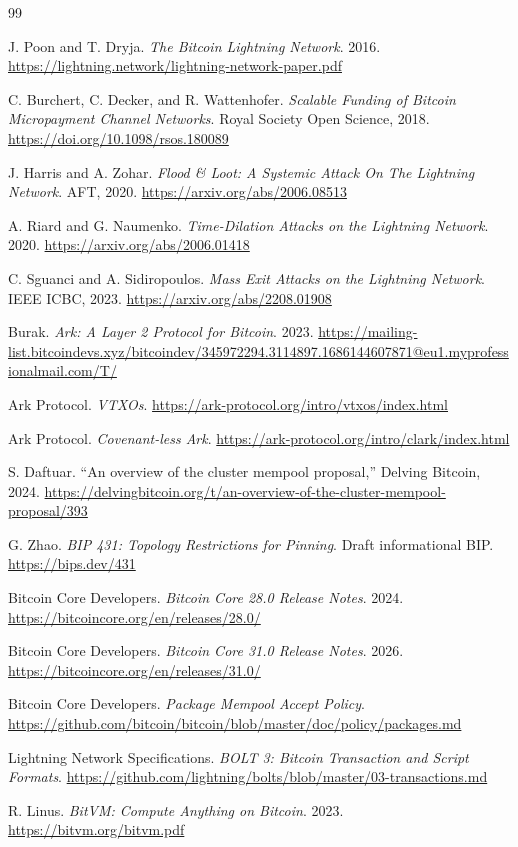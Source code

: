 \documentclass{article}
\theoremstyle{definition}
\begin{document}
\begin{thebibliography}{99}
\raggedright

 J. Poon and T. Dryja.
\emph{The Bitcoin Lightning Network}. 2016. \url{https://lightning.network/lightning-network-paper.pdf}

 C. Burchert, C. Decker, and R. Wattenhofer.
\emph{Scalable Funding of Bitcoin Micropayment Channel Networks}.
Royal Society Open Science, 2018. \url{https://doi.org/10.1098/rsos.180089}

 J. Harris and A. Zohar.
\emph{Flood \& Loot: A Systemic Attack On The Lightning Network}. AFT, 2020. \url{https://arxiv.org/abs/2006.08513}

 A. Riard and G. Naumenko.
\emph{Time-Dilation Attacks on the Lightning Network}. 2020. \url{https://arxiv.org/abs/2006.01418}

 C. Sguanci and A. Sidiropoulos.
\emph{Mass Exit Attacks on the Lightning Network}.
IEEE ICBC, 2023. \url{https://arxiv.org/abs/2208.01908}

 Burak.
\emph{Ark: A Layer 2 Protocol for Bitcoin}. 2023. \url{https://mailing-list.bitcoindevs.xyz/bitcoindev/345972294.3114897.1686144607871@eu1.myprofessionalmail.com/T/}

 Ark Protocol.
\emph{VTXOs}. \url{https://ark-protocol.org/intro/vtxos/index.html}

 Ark Protocol.
\emph{Covenant-less Ark}. \url{https://ark-protocol.org/intro/clark/index.html}

 S. Daftuar.
``An overview of the cluster mempool proposal,'' Delving Bitcoin, 2024. \url{https://delvingbitcoin.org/t/an-overview-of-the-cluster-mempool-proposal/393}

 G. Zhao.
\emph{BIP 431: Topology Restrictions for Pinning}. Draft informational BIP. \url{https://bips.dev/431}

 Bitcoin Core Developers.
\emph{Bitcoin Core 28.0 Release Notes}. 2024. \url{https://bitcoincore.org/en/releases/28.0/}

 Bitcoin Core Developers.
\emph{Bitcoin Core 31.0 Release Notes}. 2026. \url{https://bitcoincore.org/en/releases/31.0/}

 Bitcoin Core Developers.
\emph{Package Mempool Accept Policy}. \url{https://github.com/bitcoin/bitcoin/blob/master/doc/policy/packages.md}

 Lightning Network Specifications.
\emph{BOLT 3: Bitcoin Transaction and Script Formats}. \url{https://github.com/lightning/bolts/blob/master/03-transactions.md}

 R. Linus.
\emph{BitVM: Compute Anything on Bitcoin}. 2023. \url{https://bitvm.org/bitvm.pdf}

\end{thebibliography}
\end{document}
